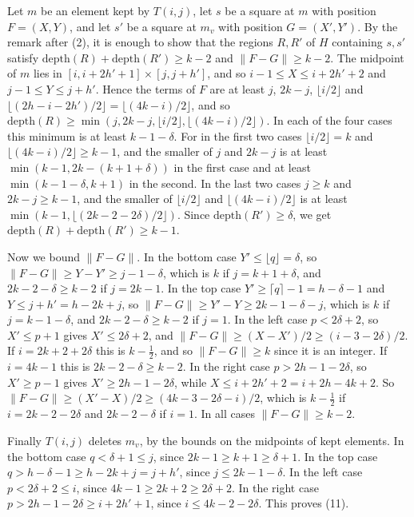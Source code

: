 {Let $m$ be an element kept by $T(i, j)$, let $s$ be a square at $m$ with position $F = (X, Y)$, and let $s'$ be a square at $m_v$ with position $G = (X', Y')$. By the remark after (2), it is enough to show that the regions $R, R'$ of $H$ containing $s, s'$ satisfy $\text{depth}(R) + \text{depth}(R') \ge k - 2$ and $\|F - G\| \ge k - 2$. The midpoint of $m$ lies in $[i, i + 2h' + 1] \times [j, j + h']$, and so $i - 1 \le X \le i + 2h' + 2$ and $j - 1 \le Y \le j + h'$. Hence the terms of $F$ are at least $j$, $2k - j$, $\lfloor i/2 \rfloor$ and $\lfloor (2h - i - 2h')/2 \rfloor = \lfloor (4k - i)/2 \rfloor$, and so $\text{depth}(R) \ge \min(j, 2k - j, \lfloor i/2 \rfloor, \lfloor (4k - i)/2 \rfloor)$. In each of the four cases this minimum is at least $k - 1 - \delta$. For in the first two cases $\lfloor i/2 \rfloor = k$ and $\lfloor (4k - i)/2 \rfloor \ge k - 1$, and the smaller of $j$ and $2k - j$ is at least $\min(k - 1, 2k - (k + 1 + \delta))$ in the first case and at least $\min(k - 1 - \delta, k + 1)$ in the second. In the last two cases $j \ge k$ and $2k - j \ge k - 1$, and the smaller of $\lfloor i/2 \rfloor$ and $\lfloor (4k - i)/2 \rfloor$ is at least $\min(k - 1, \lfloor (2k - 2 - 2\delta)/2 \rfloor)$. Since $\text{depth}(R') \ge \delta$, we get $\text{depth}(R) + \text{depth}(R') \ge k - 1$.

Now we bound $\|F - G\|$. In the bottom case $Y' \le \lfloor q \rfloor = \delta$, so $\|F - G\| \ge Y - Y' \ge j - 1 - \delta$, which is $k$ if $j = k + 1 + \delta$, and $2k - 2 - \delta \ge k - 2$ if $j = 2k - 1$. In the top case $Y' \ge \lceil q \rceil - 1 = h - \delta - 1$ and $Y \le j + h' = h - 2k + j$, so $\|F - G\| \ge Y' - Y \ge 2k - 1 - \delta - j$, which is $k$ if $j = k - 1 - \delta$, and $2k - 2 - \delta \ge k - 2$ if $j = 1$. In the left case $p < 2\delta + 2$, so $X' \le p + 1$ gives $X' \le 2\delta + 2$, and $\|F - G\| \ge (X - X')/2 \ge (i - 3 - 2\delta)/2$. If $i = 2k + 2 + 2\delta$ this is $k - \frac{1}{2}$, and so $\|F - G\| \ge k$ since it is an integer. If $i = 4k - 1$ this is $2k - 2 - \delta \ge k - 2$. In the right case $p > 2h - 1 - 2\delta$, so $X' \ge p - 1$ gives $X' \ge 2h - 1 - 2\delta$, while $X \le i + 2h' + 2 = i + 2h - 4k + 2$. So $\|F - G\| \ge (X' - X)/2 \ge (4k - 3 - 2\delta - i)/2$, which is $k - \frac{1}{2}$ if $i = 2k - 2 - 2\delta$ and $2k - 2 - \delta$ if $i = 1$. In all cases $\|F - G\| \ge k - 2$.

Finally $T(i, j)$ deletes $m_v$, by the bounds on the midpoints of kept elements. In the bottom case $q < \delta + 1 \le j$, since $2k - 1 \ge k + 1 \ge \delta + 1$. In the top case $q > h - \delta - 1 \ge h - 2k + j = j + h'$, since $j \le 2k - 1 - \delta$. In the left case $p < 2\delta + 2 \le i$, since $4k - 1 \ge 2k + 2 \ge 2\delta + 2$. In the right case $p > 2h - 1 - 2\delta \ge i + 2h' + 1$, since $i \le 4k - 2 - 2\delta$. This proves (11).

}
